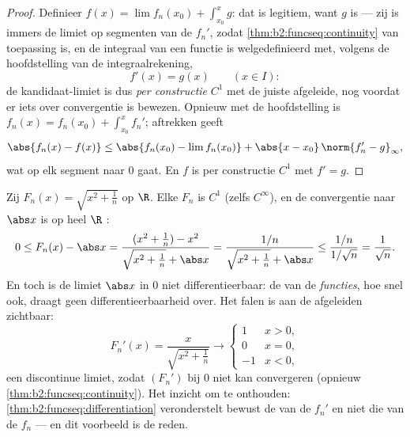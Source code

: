\begin{proof}
Definieer $f(x) = \lim f_n(x_0) + \int_{x_0}^x g$: dat is
legitiem, want $g$ is  --- zij is immers de \emph{}
limiet op segmenten van de  $f_n'$, zodat
\cref{thm:b2:funcseq:continuity} van toepassing is, en de
integraal van een  functie is welgedefinieerd met, volgens
de hoofdstelling van de integraalrekening,
\[
f'(x) = g(x) \qquad (x \in I) :
\]
de kandidaat-limiet is dus \emph{per constructie} $C^1$ met de
juiste afgeleide, nog voordat er iets over convergentie is
bewezen. Opnieuw met de hoofdstelling is $f_n(x) = f_n(x_0) +
\int_{x_0}^x f_n'$; aftrekken geeft
\[
\abs{f_n(x) - f(x)} \leq \abs{f_n(x_0) - \lim f_n(x_0)}
+ \abs{x - x_0}\,\norm{f_n' - g}_{\infty} ,
\]
wat op elk segment  naar $0$ gaat. En $f$ is per constructie
$C^1$ met $f' = g$.
\end{proof}

\begin{example}\label{ex:b2:funcseq:sqrtabs}
Zij $F_n(x) = \sqrt{x^2 + \frac1n}$ op $\R$. Elke $F_n$ is $C^1$
(zelfs $C^\infty$), en de convergentie naar $\abs x$ is op heel
$\R$ :
\[
0 \leq F_n(x) - \abs x
= \frac{(x^2 + \frac1n) - x^2}{\sqrt{x^2+\frac1n} + \abs x}
= \frac{1/n}{\sqrt{x^2 + \frac1n} + \abs x}
\leq \frac{1/n}{1/\sqrt n} = \frac{1}{\sqrt n} .
\]
En toch is de limiet $\abs x$ in $0$ niet differentieerbaar: de
 van de \emph{functies}, hoe snel ook,
draagt geen differentieerbaarheid over. Het falen is aan de
afgeleiden zichtbaar:
\[
F_n'(x) = \frac{x}{\sqrt{x^2 + \frac1n}}
\longrightarrow \begin{cases} 1 & x > 0,\\ 0 & x = 0,\\
-1 & x < 0, \end{cases}
\]
een discontinue  limiet, zodat $(F_n')$ bij $0$ niet
 kan convergeren (opnieuw
\cref{thm:b2:funcseq:continuity}). Het inzicht om te onthouden:
\cref{thm:b2:funcseq:differentiation} veronderstelt bewust de
 van de $f_n'$ en niet die van de $f_n$ ---
en dit voorbeeld is de reden.
\end{example}

